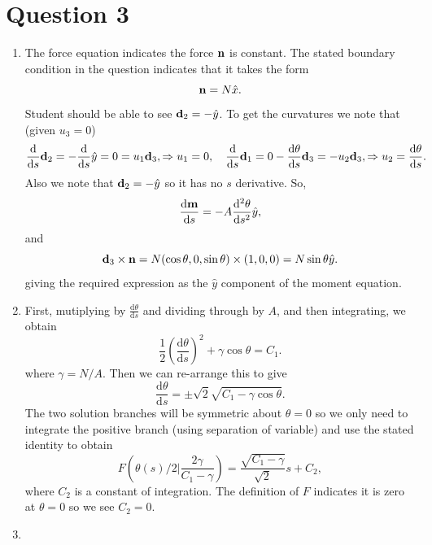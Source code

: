\documentclass[]{article}
\newcommand{\rmd}{\mathrm{d}}
\newcommand{\deriv}[2]{\frac{\rmd#1}{\rmd #2}}
\newcommand{\derivn}[3]{\frac{\rmd^{#3} #1}{\rmd #2^{#3}}}
\begin{document}
\section*{Question 3}
		\begin{enumerate}[label=(\alph*)]
\item{
The force equation indicates the force ${\bf n}$ is constant. The stated boundary condition in the question indicates that it 
takes the form
\begin{equation}
{\bf n} =N\hat{x}.
\end{equation} 
Student should be able to see ${\bf d}_2=-\hat{y}$.
To get the curvatures we note that (given $u_3=0$)
\begin{equation}
\deriv{}{s} {\bf d}_2 =-\deriv{}{s} \hat{y} = 0= u_1 {\bf d}_3,\Rightarrow u_1=0,\quad \deriv{}{s} {\bf d}_1 = 0  - \deriv{\theta}{s}{\bf d}_3 = -u_2{\bf d}_3,\Rightarrow u_2= \deriv{\theta}{s}.
\end{equation}
Also we note that ${\bf d}_2=-\hat{y}$ so it has no $s$ derivative. So, 
\begin{equation}
\deriv{{\bf m}}{s} = -A\derivn{\theta}{s}{2}\hat{y},
\end{equation}
and
\begin{equation}
{\bf d}_3\times{\bf n} =N (\cos\theta,0,\sin\theta)\times(1,0,0) = N\sin\theta\hat{y}.
\end{equation}
 giving the required expression as the $\hat{y}$ component of the moment equation.
}\item{
First, mutiplying by $\deriv{\theta}{s}$ and dividing through by $A$, and then  integrating, we obtain 
\begin{equation}
\frac{1}{2}\left(\deriv{\theta}{s}\right)^2+ \gamma\cos\theta = C_1.
\end{equation}
where $\gamma= N/A$. Then we can re-arrange this to give
\begin{equation}
\deriv{\theta}{s} = \pm\sqrt{2}\sqrt{C_1-\gamma\cos\theta}.
\end{equation}
The two solution branches will be symmetric about $\theta=0$ so we only need to integrate the positive branch (using separation of variable) and use the stated identity to obtain
\begin{equation}
F\left(\theta(s)/2\bigg\vert \frac{2\gamma}{C_1-\gamma}\right) = \frac{\sqrt{C_1-\gamma}}{\sqrt{2}} s + C_2,
\end{equation}
where $C_2$ is a constant of integration. The definition of $F$ indicates it is zero at $\theta=0$ so we see $C_2=0$. 
}\item{

}
\end{enumerate}
\end{document}
